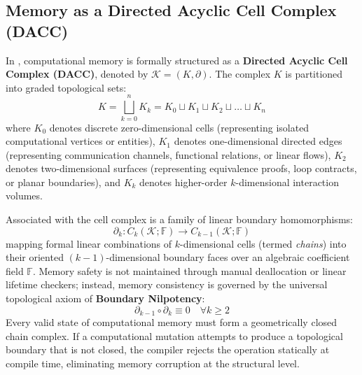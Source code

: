 \subsection{Memory as a Directed Acyclic Cell Complex (DACC)}
In \ToposLang{}, computational memory is formally structured as a \textbf{Directed Acyclic Cell Complex (DACC)}, denoted by $\mathcal{K} = (K, \partial)$. The complex $K$ is partitioned into graded topological sets:
\begin{equation}
    K = \bigsqcup_{k=0}^n K_k = K_0 \sqcup K_1 \sqcup K_2 \sqcup \dots \sqcup K_n
\end{equation}
where $K_0$ denotes discrete zero-dimensional cells (representing isolated computational vertices or entities), $K_1$ denotes one-dimensional directed edges (representing communication channels, functional relations, or linear flows), $K_2$ denotes two-dimensional surfaces (representing equivalence proofs, loop contracts, or planar boundaries), and $K_k$ denotes higher-order $k$-dimensional interaction volumes.

Associated with the cell complex is a family of linear boundary homomorphisms:
\begin{equation}
    \partial_k : C_k(\mathcal{K}; \mathbb{F}) \longrightarrow C_{k-1}(\mathcal{K}; \mathbb{F})
\end{equation}
mapping formal linear combinations of $k$-dimensional cells (termed \textit{chains}) into their oriented $(k-1)$-dimensional boundary faces over an algebraic coefficient field $\mathbb{F}$. Memory safety is not maintained through manual deallocation or linear lifetime checkers; instead, memory consistency is governed by the universal topological axiom of \textbf{Boundary Nilpotency}:
\begin{equation}
    \partial_{k-1} \circ \partial_k \equiv 0 \quad \forall k \ge 2
\end{equation}
Every valid state of computational memory must form a geometrically closed chain complex. If a computational mutation attempts to produce a topological boundary that is not closed, the compiler rejects the operation statically at compile time, eliminating memory corruption at the structural level.


